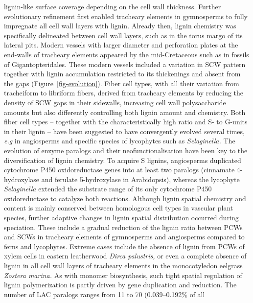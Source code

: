 \documentclass[journal=,manuscript=]{achemso}
\begin{document}
lignin-like surface coverage depending on the cell wall
thickness.\citep{Edwards2003} Further evolutionary refinement first
enabled tracheary elements in gymnosperms to fully impregnate all cell
wall layers with lignin. Already then, lignin chemistry was specifically
delineated between cell wall layers, such as in the torus margo of its
lateral pits.\citep{Schulte2021} Modern vessels with larger diameter and
perforation plates at the end-walls of tracheary elements appeared by
the mid-Cretaceous such as in fossils of
Gigantopteridales.\citep{Sperry2003} These modern vessels included a
variation in SCW pattern together with lignin accumulation restricted to
its thickenings and absent from the gaps (Figure~\ref{fig-evolution}).
Fiber cell types, with all their variation from tracheiform to libriform
fibers,\citep{Sperry2003} derived from tracheary elements by reducing
the density of SCW gaps in their sidewalls, increasing cell wall
polysaccharide amounts but also differently controlling both lignin
amount and chemistry. Both fiber cell types -- together with the
characteristically high ratio and S- to G-units in their lignin -- have
been suggested to have convergently evolved several times, \emph{e.g} in
angiosperms and specific species of lycophytes such as
\emph{Selaginella.}\citep{Jin2007} The evolution of enzyme paralogs and
their neofunctionalisation have been key to the diversification of
lignin chemistry. To acquire S lignins, angiosperms duplicated
cytochrome P450 oxidoreductase genes into at least two paralogs
(cinnamate 4-hydroxylase and ferulate 5-hydroxylase in Arabidopsis),
whereas the lycophyte \emph{Selaginella} extended the substrate range of
its only cytochrome P450 oxidoreductase to catalyze both
reactions.\citep{Weng2010} Although lignin spatial chemistry and content
is mainly conserved between homologous cell types in vascular plant
species, further adaptive changes in lignin spatial distribution
occurred during speciation. These include a gradual reduction of the
lignin ratio between PCWs and SCWs in tracheary elements of gymnosperms
and angiosperms compared to ferns and lycophytes.\citep{Boyce2004}
Extreme cases include the absence of lignin from PCWs of xylem cells in
eastern leatherwood \emph{Dirca palustris,}\citep{Mottiar2020} or even a
complete absence of lignin in all cell wall layers of tracheary elements
in the monocotyledon eelgrass \emph{Zostera marina.}\citep{Pfeifer2022}
As with monomer biosynthesis, such tight spatial regulation of lignin
polymerization is partly driven by gene duplication and reduction. The
number of LAC paralogs ranges from 11 to 70 (0.039--0.192\% of all
\end{document}
